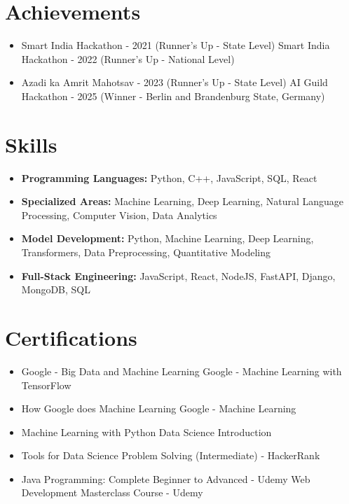\documentclass[a4paper,10pt]{article}
\begin{document}
\section*{Achievements}
\begin{itemize}
\item Smart India Hackathon - 2021 (Runner's Up - State Level) \hfill Smart India Hackathon - 2022 (Runner's Up - National Level)
\item Azadi ka Amrit Mahotsav - 2023 (Runner's Up - State Level) \hfill AI Guild Hackathon - 2025 (Winner - Berlin and Brandenburg State, Germany)
\end{itemize}

\section*{Skills}
\begin{itemize}
  \item \textbf{Programming Languages:} Python, C++, JavaScript, SQL, React
  \item \textbf{Specialized Areas:} Machine Learning, Deep Learning, Natural Language Processing, Computer Vision, Data Analytics
  \item \textbf{Model Development:} Python, Machine Learning, Deep Learning, Transformers, Data Preprocessing, Quantitative Modeling
  \item \textbf{Full-Stack Engineering:} JavaScript, React, NodeJS, FastAPI, Django, MongoDB, SQL
\end{itemize}

\section*{Certifications}
\begin{itemize}
\item Google - Big Data and Machine Learning \hfill Google - Machine Learning with TensorFlow
\item How Google does Machine Learning \hfill Google - Machine Learning
\item Machine Learning with Python \hfill Data Science Introduction
\item Tools for Data Science \hfill Problem Solving (Intermediate) - HackerRank
\item Java Programming: Complete Beginner to Advanced - Udemy \hfill Web Development Masterclass Course - Udemy
\end{itemize}
\end{document}
